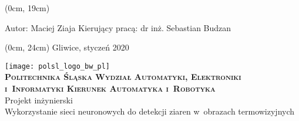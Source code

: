 \thispagestyle{empty}
\textblockorigin{3cm}{2.5cm}

\begin{onehalfspacing}
\begin{center}
    \begin{textblock*}{\textwidth}(0cm, 19cm)
	\begin{flushleft}
	Autor: Maciej Ziaja \linebreak
	Kierujący pracą: dr inż. Sebastian Budzan \linebreak
	\end{flushleft}
	\end{textblock*}
	\begin{textblock*}{\textwidth}(0cm, 24cm)
	\fontsize{12}{12} \selectfont
	Gliwice, styczeń 2020
	\end{textblock*}
    \vspace{2\baselineskip}
	\texttt{[image: polsl\_logo\_bw\_pl]}\\
	\vspace{2\baselineskip}
	\fontsize{18}{18} \selectfont
	\textbf{\textsc{Politechnika Śląska \linebreak
	Wydział Automatyki, Elektroniki i~Informatyki \linebreak
	Kierunek Automatyka i~Robotyka}} \\
	\vspace{3\baselineskip}
	Projekt inżynierski \\
	\vspace{3\baselineskip}
	\fontsize{14}{14} \selectfont
	Wykorzystanie sieci neuronowych do detekcji ziaren
	w~obrazach termowizyjnych
\end{center}
\end{onehalfspacing}
\restoregeometry
